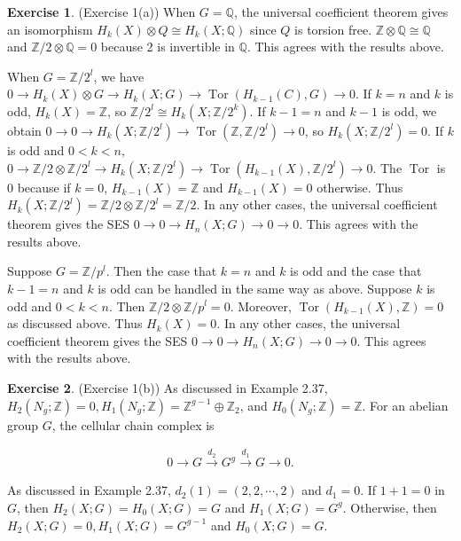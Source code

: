 \documentclass[12pt, psamsfonts]{amsart}
\theoremstyle{definition}
\newtheorem*{exer}{Exercise}
\theoremstyle{remark}
\DeclareMathOperator{\Tor}{Tor}
\numberwithin{equation}{section}
\begin{document}
\begin{exer}{(Exercise 1(a))}
  When $G = \mathbb{Q}$, the universal coefficient theorem gives an isomorphism $H_k(X) \otimes Q \cong H_k(X; \mathbb{Q})$ since $Q$ is torsion free.
  $\mathbb{Z} \otimes \mathbb{Q} \cong \mathbb{Q}$ and $\mathbb{Z} / 2 \otimes \mathbb{Q} = 0$ because 2 is invertible in $\mathbb{Q}$.
  This agrees with the results above.

  When $G = \mathbb{Z} / 2^l$, we have $0 \rightarrow H_k(X) \otimes G \rightarrow H_k(X; G) \rightarrow \Tor(H_{k - 1}(C), G) \rightarrow 0$.
  If $k = n$ and $k$ is odd, $H_k(X) = \mathbb{Z}$, so $\mathbb{Z} / 2^l \cong H_k(X; \mathbb{Z} / 2^k)$.
  If $k - 1 = n$ and $k - 1$ is odd, we obtain $0 \rightarrow 0 \rightarrow H_k(X; \mathbb{Z} / 2^l) \rightarrow \Tor(\mathbb{Z}, \mathbb{Z} / 2^l) \rightarrow 0$, so $H_k(X; \mathbb{Z} / 2^l) = 0$.
  If $k$ is odd and $0 < k < n$, $0 \rightarrow \mathbb{Z} / 2 \otimes \mathbb{Z} / 2^l \rightarrow H_k(X; \mathbb{Z} / 2^l) \rightarrow \Tor(H_{k - 1}(X), \mathbb{Z} / 2^l) \rightarrow 0$.
  The $\Tor$ is 0 because if $k = 0$, $H_{k - 1}(X) = \mathbb{Z}$ and $H_{k - 1}(X) = 0$ otherwise.
  Thus $H_k(X; \mathbb{Z} / 2^l) = \mathbb{Z} / 2 \otimes \mathbb{Z} / 2^l = \mathbb{Z} / 2$.
  In any other cases, the universal coefficient theorem gives the SES $0 \rightarrow 0 \rightarrow H_n(X; G) \rightarrow 0 \rightarrow 0$.
  This agrees with the results above.

  Suppose $G = \mathbb{Z} / p^l$.
  Then the case that $k = n$ and $k$ is odd and the case that $k - 1 = n$ and $k$ is odd can be handled in the same way as above.
  Suppose $k$ is odd and $0 < k < n$.
  Then $\mathbb{Z} / 2 \otimes \mathbb{Z} / p^l = 0$.
  Moreover, $\Tor(H_{k - 1}(X), \mathbb{Z}) = 0$ as discussed above.
  Thus $H_{k}(X) = 0$.
  In any other cases, the universal coefficient theorem gives the SES $0 \rightarrow 0 \rightarrow H_n(X; G) \rightarrow 0 \rightarrow 0$.
  This agrees with the results above.
\end{exer}


\begin{exer}{(Exercise 1(b))}
  As discussed in Example 2.37, $H_2(N_g; \mathbb{Z}) = 0, H_1(N_g; \mathbb{Z}) = \mathbb{Z}^{g - 1} \oplus \mathbb{Z}_2$, and $H_0(N_g; \mathbb{Z}) = \mathbb{Z}$.
  For an abelian group $G$, the cellular chain complex is

  \begin{align*}
    0 \rightarrow G \xrightarrow{d_2} G^g \xrightarrow{d_1} G \rightarrow 0.
  \end{align*}

  As discussed in Example 2.37, $d_2(1) = (2, 2, \cdots, 2)$ and $d_1 = 0$.
  If $1 + 1 = 0$ in $G$, then $H_2(X; G) = H_0(X; G) = G$ and $H_1(X; G) = G^g$.
  Otherwise, then $H_2(X; G) = 0, H_1(X; G) = G^{g - 1}$ and $H_0(X; G) = G$.
\end{exer}
\end{document}
